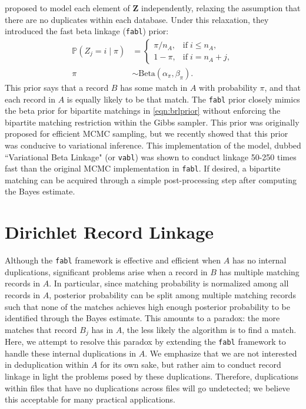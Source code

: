 \documentclass[12pt,letterpaper]{article}
\newcommand{\1}[1]{\mathbb{I}\!\left[#1\right]} %
\begin{document}
\cite{kundinger_2023} proposed to model each element of $\bm{Z}$ independently, relaxing the assumption that there are no duplicates within each database. Under this relaxation, they introduced the fast beta linkage (\texttt{fabl}) prior:
\begin{align}\label{eqn:fabl}
	\mathbb{P}(Z_j = i \mid \pi) 
	&=
	\begin{cases}
		\pi/n_A,  &  \text{if}  \; i\leq n_A,\\
		1- \pi, &   \text{if}  \;  i= n_A + j,
	\end{cases} \\
	\pi &\sim \text{Beta}(\alpha_{\pi}, \beta_{\pi}).
\end{align}
This prior says that a record $B$ has some match in $A$ with probability $\pi$, and that each record in $A$ is equally likely to be that match. The \texttt{fabl} prior closely mimics the beta prior for bipartite matchings in \eqref{eqn:brlprior} without enforcing the bipartite matching restriction within the Gibbs sampler. This prior was originally proposed for efficient MCMC sampling, but we recently showed that this prior was conducive to variational inference. This implementation of the model, dubbed ``Variational Beta Linkage" (or \texttt{vabl}) was shown to conduct linkage 50-250 times fast than the original MCMC implementation in \texttt{fabl}\citep{kundinger_2024_vabl}. If desired, a bipartite matching can be acquired through a simple post-processing step after computing the Bayes estimate. 

\section{Dirichlet Record Linkage}\label{sec:drl}


Although the \texttt{fabl} framework is effective and efficient when $A$ has no internal duplications, significant problems arise when a record in $B$ has multiple matching records in $A$. In particular, since matching probability is normalized among all records in $A$, posterior probability can be split among multiple matching records such that none of the matches achieves high enough posterior probability to be identified through the Bayes estimate. This amounts to a paradox: the more matches that record $B_j$ has in $A$, the less likely the algorithm is to find a match. Here, we attempt to resolve this paradox by extending the \texttt{fabl} framework to handle these internal duplications in $A$. We emphasize that we are not interested in deduplication within $A$ for its own sake, but rather aim to conduct record linkage in light the problems posed by these duplications. Therefore, duplications within files that have no duplications across files will go undetected; we believe this acceptable for many practical applications. 
\end{document}
